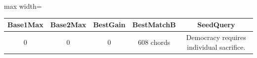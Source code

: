 \begin{table}[h]
\centering
\begin{adjustbox}{max width=\textwidth}
\begin{tabular}{ |c|c|c|c|c| }
\hline
Base1Max & Base2Max & BestGain & BestMatchB & SeedQuery \\
\hline
0 & 0 & 0 & 608 chords & Democracy requires individual sacrifice. \\
\hline
\end{tabular}
\end{adjustbox}
\end{table}
